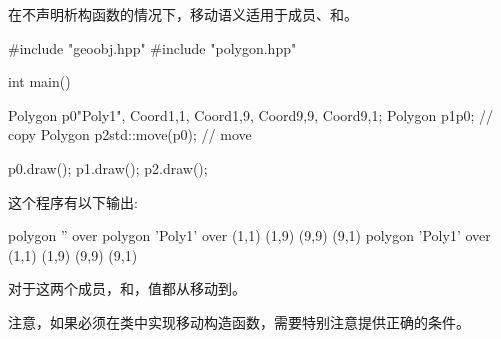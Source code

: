 在不声明析构函数的情况下，移动语义适用于成员、和。

\begin{cppcode}
#include "geoobj.hpp"
#include "polygon.hpp"

int main()
{
	Polygon p0{"Poly1", {Coord{1,1}, Coord{1,9}, Coord{9,9}, Coord{9,1}}};
	Polygon p1{p0}; // copy
	Polygon p2{std::move(p0)}; // move

	p0.draw();
	p1.draw();
	p2.draw();
}
\end{cppcode}

这个程序有以下输出:

\begin{outputcode}
polygon '' over
polygon 'Poly1' over (1,1) (1,9) (9,9) (9,1)
polygon 'Poly1' over (1,1) (1,9) (9,9) (9,1)
\end{outputcode}

对于这两个成员，和，值都从移动到。

注意，如果必须在类中实现移动构造函数，需要特别注意提供正确的条件。



























































